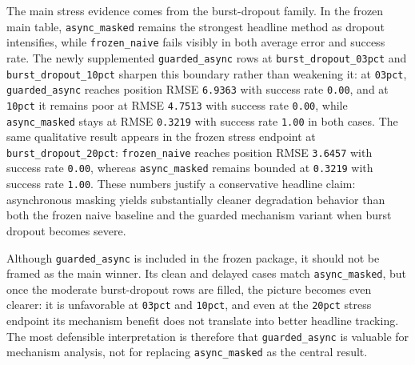 \documentclass[12pt,a4paper]{article}
\begin{document}
The main stress evidence comes from the burst-dropout family. In the frozen main table, \texttt{async\_masked} remains the strongest headline method as dropout intensifies, while \texttt{frozen\_naive} fails visibly in both average error and success rate. The newly supplemented \texttt{guarded\_async} rows at \texttt{burst\_dropout\_03pct} and \texttt{burst\_dropout\_10pct} sharpen this boundary rather than weakening it: at \texttt{03pct}, \texttt{guarded\_async} reaches position RMSE \texttt{6.9363} with success rate \texttt{0.00}, and at \texttt{10pct} it remains poor at RMSE \texttt{4.7513} with success rate \texttt{0.00}, while \texttt{async\_masked} stays at RMSE \texttt{0.3219} with success rate \texttt{1.00} in both cases. The same qualitative result appears in the frozen stress endpoint at \texttt{burst\_dropout\_20pct}: \texttt{frozen\_naive} reaches position RMSE \texttt{3.6457} with success rate \texttt{0.00}, whereas \texttt{async\_masked} remains bounded at \texttt{0.3219} with success rate \texttt{1.00}. These numbers justify a conservative headline claim: asynchronous masking yields substantially cleaner degradation behavior than both the frozen naive baseline and the guarded mechanism variant when burst dropout becomes severe.

Although \texttt{guarded\_async} is included in the frozen package, it should not be framed as the main winner. Its clean and delayed cases match \texttt{async\_masked}, but once the moderate burst-dropout rows are filled, the picture becomes even clearer: it is unfavorable at \texttt{03pct} and \texttt{10pct}, and even at the \texttt{20pct} stress endpoint its mechanism benefit does not translate into better headline tracking. The most defensible interpretation is therefore that \texttt{guarded\_async} is valuable for mechanism analysis, not for replacing \texttt{async\_masked} as the central result.
\end{document}
